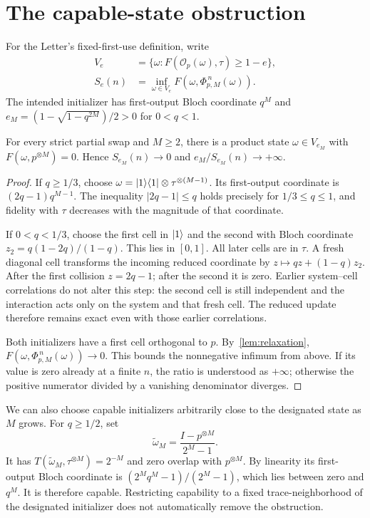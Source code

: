 \section{The capable-state obstruction}\label{app:capable}

For the Letter's fixed-first-use definition, write
\begin{align}
 V_e&=\{\omega:F(\mathcal O_p(\omega),\tau)\ge1-e\},\nonumber\\
 S_e(n)&=\inf_{\omega\in V_e}F(\omega,\Phi_{p,M}^{\,n}(\omega)).
 \label{eq:infimum}
\end{align}
The intended initializer has first-output Bloch coordinate $q^M$ and $e_M=(1-\sqrt{1-q^{2M}})/2>0$ for $0<q<1$.

\begin{proposition}\label{prop:capable}
For every strict partial swap and $M\ge2$, there is a product state $\omega\in V_{e_M}$ with $F(\omega,p^{\otimes M})=0$. Hence $S_{e_M}(n)\to0$ and $e_M/S_{e_M}(n)\to+\infty$.
\end{proposition}
\begin{proof}
If $q\ge1/3$, choose $\omega=|1\rangle\langle1|\otimes\tau^{\otimes(M-1)}$. Its first-output coordinate is $(2q-1)q^{M-1}$. The inequality $|2q-1|\le q$ holds precisely for $1/3\le q\le1$, and fidelity with $\tau$ decreases with the magnitude of that coordinate.

If $0<q<1/3$, choose the first cell in $|1\rangle$ and the second with Bloch coordinate $z_2=q(1-2q)/(1-q)$. This lies in $[0,1]$. All later cells are in $\tau$. A fresh diagonal cell transforms the incoming reduced coordinate by $z\mapsto qz+(1-q)z_2$. After the first collision $z=2q-1$; after the second it is zero. Earlier system--cell correlations do not alter this step: the second cell is still independent and the interaction acts only on the system and that fresh cell. The reduced update therefore remains exact even with those earlier correlations.

Both initializers have a first cell orthogonal to $p$. By~\cref{lem:relaxation}, $F(\omega,\Phi_{p,M}^{\,n}(\omega))\to0$. This bounds the nonnegative infimum from above. If its value is zero already at a finite $n$, the ratio is understood as $+\infty$; otherwise the positive numerator divided by a vanishing denominator diverges.
\end{proof}

We can also choose capable initializers arbitrarily close to the designated state as $M$ grows. For $q\ge1/2$, set
\begin{equation}
 \widetilde\omega_M=\frac{I-p^{\otimes M}}{2^M-1}.
\end{equation}
It has $T(\widetilde\omega_M,\tau^{\otimes M})=2^{-M}$ and zero overlap with $p^{\otimes M}$. By linearity its first-output Bloch coordinate is $(2^Mq^M-1)/(2^M-1)$, which lies between zero and $q^M$. It is therefore capable. Restricting capability to a fixed trace-neighborhood of the designated initializer does not automatically remove the obstruction.

